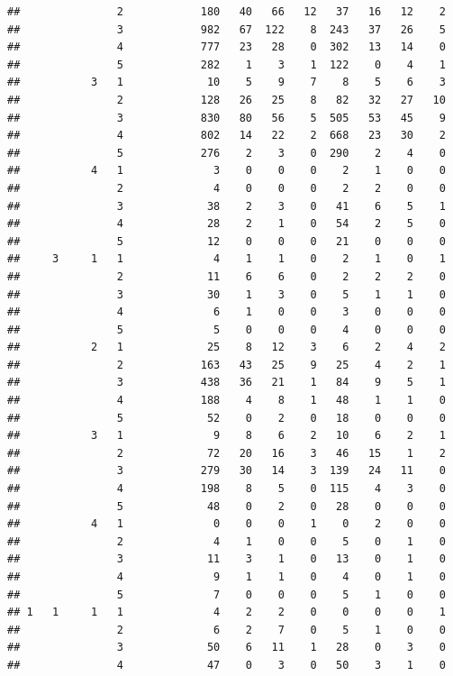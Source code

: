\documentclass{article}\usepackage[]{graphicx}\usepackage[]{xcolor}
\makeatletter
\newenvironment{kframe}{%
 \def\at@end@of@kframe{}%
 \ifinner\ifhmode%
  \def\at@end@of@kframe{\end{minipage}}%
  \begin{minipage}{\columnwidth}%
 \fi\fi%
 \def\FrameCommand##1{\hskip\@totalleftmargin \hskip-\fboxsep
 \colorbox{shadecolor}{##1}\hskip-\fboxsep
     \hskip-\linewidth \hskip-\@totalleftmargin \hskip\columnwidth}%
 \MakeFramed {\advance\hsize-\width
   \@totalleftmargin\z@ \linewidth\hsize
   \@setminipage}}%
 {\par\unskip\endMakeFramed%
 \at@end@of@kframe}
\newenvironment{knitrout}{}{} %
\makeatother
\begin{document}
\begin{knitrout}
\begin{kframe}
\begin{verbatim}
##               2            180   40   66   12   37   16   12    2
##               3            982   67  122    8  243   37   26    5
##               4            777   23   28    0  302   13   14    0
##               5            282    1    3    1  122    0    4    1
##           3   1             10    5    9    7    8    5    6    3
##               2            128   26   25    8   82   32   27   10
##               3            830   80   56    5  505   53   45    9
##               4            802   14   22    2  668   23   30    2
##               5            276    2    3    0  290    2    4    0
##           4   1              3    0    0    0    2    1    0    0
##               2              4    0    0    0    2    2    0    0
##               3             38    2    3    0   41    6    5    1
##               4             28    2    1    0   54    2    5    0
##               5             12    0    0    0   21    0    0    0
##     3     1   1              4    1    1    0    2    1    0    1
##               2             11    6    6    0    2    2    2    0
##               3             30    1    3    0    5    1    1    0
##               4              6    1    0    0    3    0    0    0
##               5              5    0    0    0    4    0    0    0
##           2   1             25    8   12    3    6    2    4    2
##               2            163   43   25    9   25    4    2    1
##               3            438   36   21    1   84    9    5    1
##               4            188    4    8    1   48    1    1    0
##               5             52    0    2    0   18    0    0    0
##           3   1              9    8    6    2   10    6    2    1
##               2             72   20   16    3   46   15    1    2
##               3            279   30   14    3  139   24   11    0
##               4            198    8    5    0  115    4    3    0
##               5             48    0    2    0   28    0    0    0
##           4   1              0    0    0    1    0    2    0    0
##               2              4    1    0    0    5    0    1    0
##               3             11    3    1    0   13    0    1    0
##               4              9    1    1    0    4    0    1    0
##               5              7    0    0    0    5    1    0    0
## 1   1     1   1              4    2    2    0    0    0    0    1
##               2              6    2    7    0    5    1    0    0
##               3             50    6   11    1   28    0    3    0
##               4             47    0    3    0   50    3    1    0

\end{verbatim}
\end{kframe}
\end{knitrout}
\end{document}
